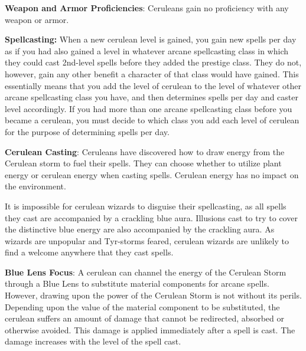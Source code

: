 {
\textbf{Weapon and Armor Proficiencies}: Ceruleans gain no proficiency with any weapon or armor.

\textbf{Spellcasting:} When a new cerulean level is gained, you gain new spells per day as if you had also gained a level in whatever arcane spellcasting class in which they could cast 2nd-level spells before they added the prestige class. They do not, however, gain any other benefit a character of that class would have gained. This essentially means that you add the level of cerulean to the level of whatever other arcane spellcasting class you have, and then determines spells per day and caster level accordingly. If you had more than one arcane spellcasting class before you became a cerulean, you must decide to which class you add each level of cerulean for the purpose of determining spells per day.

\textbf{Cerulean Casting}: Ceruleans have discovered how to draw energy from the Cerulean storm to fuel their spells. They can choose whether to utilize plant energy or cerulean energy when casting spells. Cerulean energy has no impact on the environment.

It is impossible for cerulean wizards to disguise their spellcasting, as all spells they cast are accompanied by a crackling blue aura. Illusions cast to try to cover the distinctive blue energy are also accompanied by the crackling aura. As wizards are unpopular and Tyr-storms feared, cerulean wizards are unlikely to find a welcome anywhere that they cast spells.

\textbf{Blue Lens Focus}: A cerulean can channel the energy of the Cerulean Storm through a Blue Lens to substitute material components for arcane spells. However, drawing upon the power of the Cerulean Storm is not without its perils. Depending upon the value of the material component to be substituted, the cerulean suffers an amount of damage that cannot be redirected, absorbed or otherwise avoided. This damage is applied immediately after a spell is cast. The damage increases with the level of the spell cast.


}

